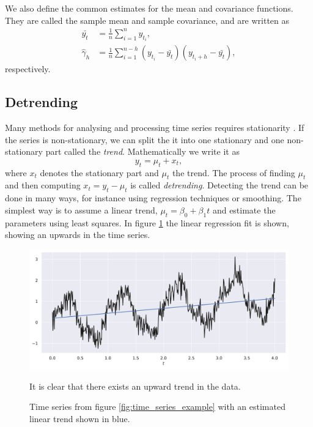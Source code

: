 \documentclass[a4paper, 10pt]{memoir}
\theoremstyle{plain}
\theoremstyle{definition}
\theoremstyle{remark}
\begin{document}
We also define the common estimates for the mean and covariance functions.
They are called the sample mean and sample covariance, and are written as
\begin{align}\label{eq:sample_mean}
        \bar{y_t} &= \frac{1}{n}\sum_{i = 1}^{n} y_{t_i}, \\
        \label{eq:sample_covariance}
        \hat{\gamma}_h &= \frac{1}{n} \sum_{i = 1}^{n - h}(y_{t_i} - \bar{y_t})(y_{t_i  + h} - \bar{y_t}),
\end{align}
respectively.


\subsection{Detrending}
Many methods for analysing and processing time series requires stationarity \cite{shumway}.
If the series is non-stationary, we can split the it into one stationary and one non-stationary part called the \textit{trend}.
Mathematically we write it as 
\begin{equation*}
        y_t = \mu_t + x_t,
\end{equation*}
where $x_t$ denotes the stationary part and $\mu_t$ the trend.
The process of finding $\mu_t$ and then computing $x_t = y_t - \mu_t$ is called \textit{detrending}.
Detecting the trend can be done in many ways, for instance using regression techniques or smoothing.
The simplest way is to assume a linear trend, $\mu_t = \beta_0 + \beta_1 t$ and estimate the parameters using least squares.
In figure \ref{fig:time_series_example_with_trend} the linear regression fit is shown, showing an upwards in the time series.


\begin{figure}[tb]
        \centering
        \includegraphics[width=\linewidth]{./code/figures/time_series_example_with_trend.pdf}
        \caption{Time series from figure \ref{fig:time_series_example} with an estimated linear trend shown in blue.}
        It is clear that there exists an upward trend in the data.
        \label{fig:time_series_example_with_trend}
\end{figure}
\end{document}
